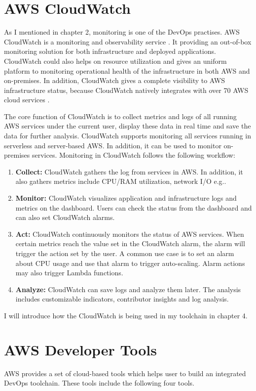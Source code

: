 \section{AWS CloudWatch}
As I mentioned in chapter 2, monitoring is one of the DevOps practises. AWS CloudWatch is a monitoring and observability service \cite{AmazonCl65:online}. It providing an out-of-box monitoring solution for both infrastructure and deployed applications. CloudWatch could also helps on resource utilization and gives an uniform platform to monitoring operational health of the infrastructure in both AWS and on-premises. In addition, CloudWatch gives a complete visibility to AWS infrastructure status, because CloudWatch natively integrates with over 70 AWS cloud services \cite{AmazonCl65:online}.
\par
The core function of CloudWatch is to collect metrics and logs of all running AWS services under the current user, display these data in real time and save the data for further analysis.
CloudWatch supports monitoring all services running in serverless and server-based AWS. In addition, it can be used to monitor on-premises services. Monitoring in CloudWatch follows the following workflow:
\begin{enumerate}
    \item \textbf{Collect:} CloudWatch gathers the log from services in AWS. In addition, it also gathers metrics include CPU/RAM utilization, network I/O e.g..
    \item \textbf{Monitor:} CloudWatch visualizes application and infrastructure logs and metrics on the dashboard. Users can check the status from the dashboard and can also set CloudWatch alarms.
    \item \textbf{Act:} CloudWatch continuously monitors the status of AWS services.
    When certain metrics reach the value set in the CloudWatch alarm, the alarm will trigger the action set by the user. A common use case is to set an alarm about CPU usage and use that alarm to trigger auto-scaling. Alarm actions may also trigger Lambda functions.
    \item \textbf{Analyze:} CloudWatch can save logs and analyze them later. The analysis includes customizable indicators, contributor insights and log analysis.
\end{enumerate}
I will introduce how the CloudWatch is being used in my toolchain in chapter 4.
\section{AWS Developer Tools}
AWS provides a set of cloud-based tools which helps user to build an integrated DevOps toolchain. These tools include the following four tools.
